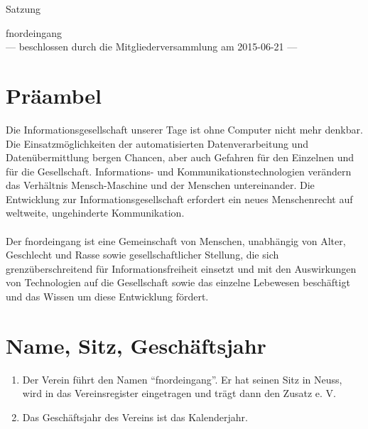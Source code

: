 \documentclass[ngerman]{scrartcl}
\begin{document}
\renewcommand*{\othersectionlevelsformat}[3]{\S#3\autodot\enskip}
\begin{titlepage}
\centerline{\Large Satzung}
\begin{center}
{\Huge fnordeingang}\\[5mm]
\vfill
--- beschlossen durch die Mitgliederversammlung am 2015-06-21 ---
\end{center}
\end{titlepage}
\section*{Präambel} \label{sec:praeambel}
Die Informationsgesellschaft unserer Tage ist ohne Computer nicht mehr denkbar. Die Einsatzmöglichkeiten
der automatisierten Datenverarbeitung und Datenübermittlung bergen
Chancen, aber auch Gefahren für den Einzelnen und für die Gesellschaft. Informations- und
Kommunikationstechnologien verändern das Verhältnis Mensch-Maschine und der
Menschen untereinander. Die Entwicklung zur Informationsgesellschaft erfordert ein neues
Menschenrecht auf weltweite, ungehinderte Kommunikation.\\
\\
Der fnordeingang ist eine Gemeinschaft von Menschen, unabhängig von Alter,
Geschlecht und Rasse sowie gesellschaftlicher Stellung, die sich grenzüberschreitend für
Informationsfreiheit einsetzt und mit den Auswirkungen von Technologien auf die Gesellschaft
sowie das einzelne Lebewesen beschäftigt und das Wissen um diese Entwicklung
fördert.
\section{Name, Sitz, Geschäftsjahr} \label{sec:name_sitz_geschaeftsjahr}
\begin{enumerate}
 \item Der Verein führt den Namen "`fnordeingang"'. Er hat
 seinen Sitz in Neuss, wird in das Vereinsregister
 eingetragen und trägt dann den Zusatz e. V.
 \item Das Geschäftsjahr des Vereins ist das Kalenderjahr.
\end{enumerate}
\end{document}
